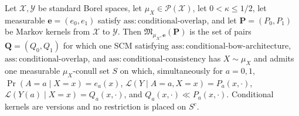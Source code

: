 Let \(\mathcal X,\mathcal Y\) be standard Borel spaces, let \(\mu_X\in\mathcal P(\mathcal X)\), let \(0<\kappa\le1/2\), let measurable \(\boldsymbol e=(e_0,e_1)\) satisfy \(\mathrm{ass:conditional\text{-}overlap}\), and let \(\boldsymbol P=(P_0,P_1)\) be Markov kernels from \(\mathcal X\) to \(\mathcal Y\).  Then \(\mathfrak M_{\mu_X,\boldsymbol e}(\boldsymbol P)\) is the set of pairs \(\boldsymbol Q=(Q_0,Q_1)\) for which one SCM satisfying \(\mathrm{ass:conditional\text{-}bow\text{-}architecture}\), \(\mathrm{ass:conditional\text{-}overlap}\), and \(\mathrm{ass:conditional\text{-}consistency}\) has \(X\sim\mu_X\) and admits one measurable \(\mu_X\)-conull set \(S\) on which, simultaneously for \(a=0,1\), \(\Pr(A=a\mid X=x)=e_a(x)\), \(\mathcal L(Y\mid A=a,X=x)=P_a(x,\cdot)\), \(\mathcal L(Y(a)\mid X=x)=Q_a(x,\cdot)\), and \(Q_a(x,\cdot)\ll P_a(x,\cdot)\).  Conditional kernels are versions and no restriction is placed on \(S^c\).
